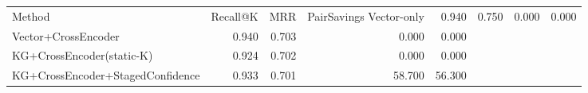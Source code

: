 \begin{tabular}{lrrrr}
\toprule
Method & Recall@K & MRR & PairSavings%
\midrule
Vector-only & 0.940 & 0.750 & 0.000 & 0.000 \\
Vector+CrossEncoder & 0.940 & 0.703 & 0.000 & 0.000 \\
KG+CrossEncoder(static-K) & 0.924 & 0.702 & 0.000 & 0.000 \\
KG+CrossEncoder+StagedConfidence & 0.933 & 0.701 & 58.700 & 56.300 \\
\bottomrule
\end{tabular}
